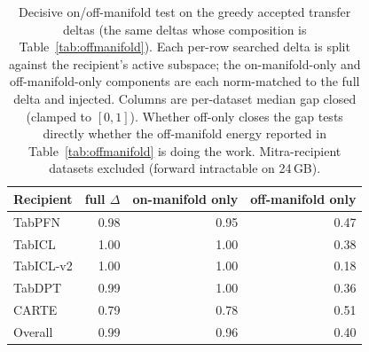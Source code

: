 \begin{table}[t]
\centering
\small
\begin{tabular}{l r r r}
\toprule
Recipient & full $\Delta$ & on-manifold only & off-manifold only \\
\midrule
TabPFN & 0.98 & 0.95 & 0.47 \\
TabICL & 1.00 & 1.00 & 0.38 \\
TabICL-v2 & 1.00 & 1.00 & 0.18 \\
TabDPT & 0.99 & 1.00 & 0.36 \\
CARTE & 0.79 & 0.78 & 0.51 \\
\midrule
Overall & 0.99 & 0.96 & 0.40 \\
\bottomrule
\end{tabular}
\caption{%
  Decisive on/off-manifold test on the greedy accepted transfer deltas   (the same deltas whose composition is Table~\ref{tab:offmanifold}). Each   per-row searched delta is split against the recipient's active subspace;   the on-manifold-only and off-manifold-only components are each   norm-matched to the full delta and injected. Columns are per-dataset   median gap closed (clamped to $[0,1]$). Whether off-only closes the gap   tests directly whether the off-manifold energy reported in   Table~\ref{tab:offmanifold} is doing the work. Mitra-recipient datasets   excluded (forward intractable on 24\,GB).
}
\label{tab:greedy_split}
\end{table}